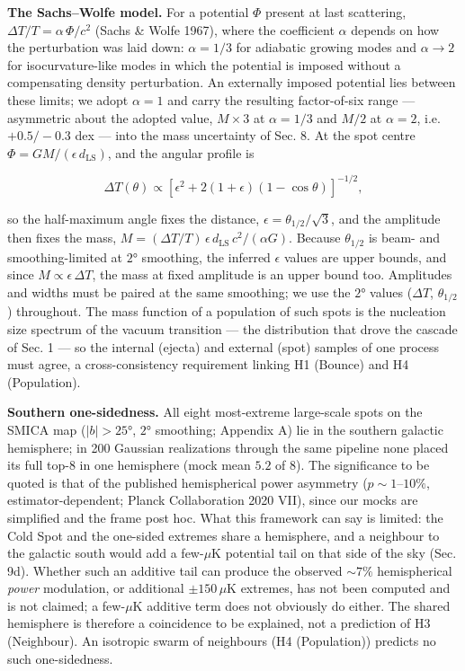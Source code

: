 \documentclass[
]{article}
\begin{document}
\textbf{The Sachs--Wolfe model.} For a potential \(\Phi\) present at
last scattering, \(\Delta T/T = \alpha\,\Phi/c^2\) (Sachs \& Wolfe
1967), where the coefficient \(\alpha\) depends on how the perturbation
was laid down: \(\alpha = 1/3\) for adiabatic growing modes and
\(\alpha \to 2\) for isocurvature-like modes in which the potential is
imposed without a compensating density perturbation. An externally
imposed potential lies between these limits; we adopt \(\alpha = 1\) and
carry the resulting factor-of-six range --- asymmetric about the adopted
value, \(M \times 3\) at \(\alpha = 1/3\) and \(M/2\) at \(\alpha = 2\),
i.e.~\(+0.5/-0.3\) dex --- into the mass uncertainty of Sec. 8. At the
spot centre \(\Phi = GM/(\epsilon\,d_{\text{LS}})\), and the angular
profile is

\[\Delta T(\theta) \propto \left[\epsilon^2 + 2(1+\epsilon)(1-\cos\theta)\right]^{-1/2},\]

so the half-maximum angle fixes the distance,
\(\epsilon = \theta_{1/2}/\sqrt{3}\), and the amplitude then fixes the
mass, \(M = (\Delta T/T)\,\epsilon\,d_{\text{LS}}\,c^2/(\alpha G)\).
Because \(\theta_{1/2}\) is beam- and smoothing-limited at \(2°\)
smoothing, the inferred \(\epsilon\) values are upper bounds, and since
\(M \propto \epsilon\,\Delta T\), the mass at fixed amplitude is an
upper bound too. Amplitudes and widths must be paired at the same
smoothing; we use the \(2°\) values (\(\Delta T\), \(\theta_{1/2}\))
throughout. The mass function of a population of such spots is the
nucleation size spectrum of the vacuum transition --- the distribution
that drove the cascade of Sec. 1 --- so the internal (ejecta) and
external (spot) samples of one process must agree, a cross-consistency
requirement linking H1 (Bounce) and H4 (Population).

\textbf{Southern one-sidedness.} All eight most-extreme large-scale
spots on the SMICA map (\(|b| > 25°\), \(2°\) smoothing; Appendix A) lie
in the southern galactic hemisphere; in 200 Gaussian realizations
through the same pipeline none placed its full top-8 in one hemisphere
(mock mean \(5.2\) of \(8\)). The significance to be quoted is that of
the published hemispherical power asymmetry (\(p \sim 1\)--\(10\%\),
estimator-dependent; Planck Collaboration 2020 VII), since our mocks are
simplified and the frame post hoc. What this framework can say is
limited: the Cold Spot and the one-sided extremes share a hemisphere,
and a neighbour to the galactic south would add a few-\(\mu\)K potential
tail on that side of the sky (Sec. 9d). Whether such an additive tail
can produce the observed \(\sim\!7\%\) hemispherical \emph{power}
modulation, or additional \(\pm 150\,\mu\)K extremes, has not been
computed and is not claimed; a few-\(\mu\)K additive term does not
obviously do either. The shared hemisphere is therefore a coincidence to
be explained, not a prediction of H3 (Neighbour). An isotropic swarm of
neighbours (H4 (Population)) predicts no such one-sidedness.
\end{document}
